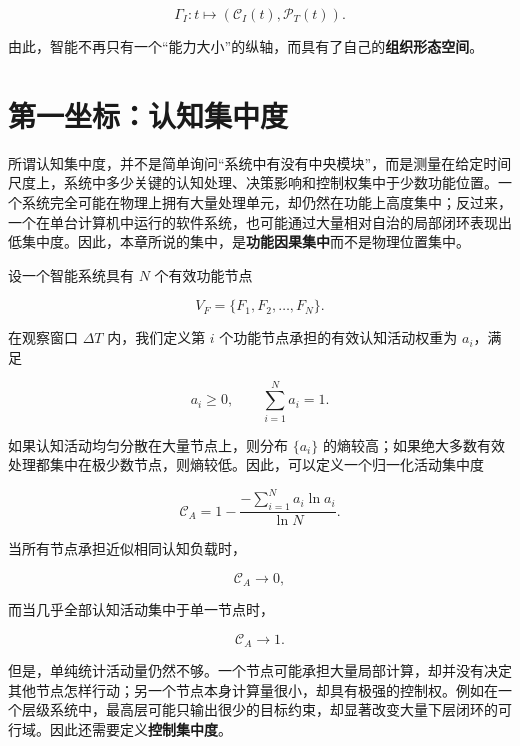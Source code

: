 \begin{equation}
\Gamma_I:
t
\longmapsto
\left(
\mathcal{C}_{I}(t),
\mathcal{P}_{T}(t)
\right).
\end{equation}

由此，智能不再只有一个“能力大小”的纵轴，而具有了自己的\textbf{组织形态空间}。

\section{第一坐标：认知集中度}
\label{sec:cognitive_concentration}

所谓认知集中度，并不是简单询问“系统中有没有中央模块”，而是测量在给定时间尺度上，系统中多少关键的认知处理、决策影响和控制权集中于少数功能位置。一个系统完全可能在物理上拥有大量处理单元，却仍然在功能上高度集中；反过来，一个在单台计算机中运行的软件系统，也可能通过大量相对自治的局部闭环表现出低集中度。因此，本章所说的集中，是\textbf{功能因果集中}而不是物理位置集中。

设一个智能系统具有 $N$ 个有效功能节点

\begin{equation}
V_F=\{F_1,F_2,\ldots,F_N\}.
\end{equation}

在观察窗口 $\Delta T$ 内，我们定义第 $i$ 个功能节点承担的有效认知活动权重为 $a_i$，满足

\begin{equation}
a_i\geq 0,
\qquad
\sum_{i=1}^{N}a_i=1.
\end{equation}

如果认知活动均匀分散在大量节点上，则分布 $\{a_i\}$ 的熵较高；如果绝大多数有效处理都集中在极少数节点，则熵较低。因此，可以定义一个归一化活动集中度

\begin{equation}
\mathcal{C}_{A}
=
1-
\frac{
-\sum_{i=1}^{N}a_i\ln a_i
}{
\ln N
}.
\end{equation}

当所有节点承担近似相同认知负载时，

\begin{equation}
\mathcal{C}_{A}\rightarrow 0,
\end{equation}

而当几乎全部认知活动集中于单一节点时，

\begin{equation}
\mathcal{C}_{A}\rightarrow 1.
\end{equation}

但是，单纯统计活动量仍然不够。一个节点可能承担大量局部计算，却并没有决定其他节点怎样行动；另一个节点本身计算量很小，却具有极强的控制权。例如在一个层级系统中，最高层可能只输出很少的目标约束，却显著改变大量下层闭环的可行域。因此还需要定义\textbf{控制集中度}。

